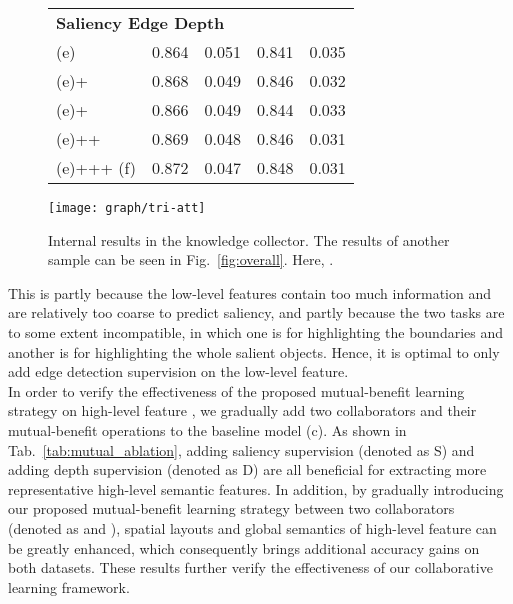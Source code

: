 \documentclass[runningheads]{llncs}
\begin{document}
\begin{wrapfigure}{r}{0.52\textwidth}
\begin{minipage}[t]{0.52\textwidth}
\begin{minipage}[t]{1\textwidth}
{\begin{tabular}{lcccc}
			\multicolumn{5}{l}{\textbf{Saliency  Edge  Depth}} \\
						(e)							&0.864	&0.051	&0.841	&0.035\\
						(e)+				&0.868	&0.049	&0.846	&0.032\\
						(e)+					&0.866	&0.049	&0.844	&0.033\\
				(e)++			       &0.869	&0.048	&0.846	&0.031\\
                    (e)+++ (f)	 	&0.872	&0.047	&0.848	&0.031\\\bottomrule
	\end{tabular}}
	\label{tab:mutual_ablation}
\end{minipage}
 	 \vfill
	\begin{minipage}[t]{1\linewidth}
\vspace{0.2cm}
  \centerline{\texttt{[image: graph/tri-att]}}
  \vspace{-0.3cm}
  \caption{Internal results in the knowledge collector. The results of another sample can be seen in Fig.~\ref{fig:overall}. Here, .}
  \label{fig:tri-att}
\end{minipage}
\end{minipage}
\vspace{-0.55cm}
\label{fig:res}
\end{wrapfigure}
This is partly because the low-level features contain too much information and are relatively too coarse to predict saliency, and partly because the two tasks are to some extent incompatible, in which one is for highlighting the boundaries and another is for highlighting the whole salient objects.
Hence, it is optimal to only add edge detection supervision on the low-level feature.
\\
In order to verify the effectiveness of the proposed mutual-benefit learning strategy on high-level feature , we gradually add two collaborators and their mutual-benefit operations to the baseline model (c).
As shown in Tab.~\ref{tab:mutual_ablation}, adding saliency supervision (denoted as S) and adding depth supervision (denoted as D) are all beneficial for extracting more representative high-level semantic features.
In addition, by gradually introducing our proposed mutual-benefit learning strategy between two collaborators (denoted as  and ), spatial layouts and global semantics of high-level feature can be greatly enhanced, which consequently brings additional accuracy gains on both datasets.
These results further verify the effectiveness of our collaborative learning framework.
\end{document}
